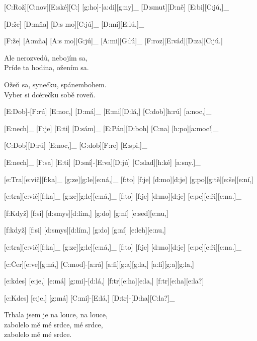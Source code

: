 
[C:Rož][C:nov][E:ské][C:] [g:ho]-[a:di][g:ny]_
[D:smut][D:ně] [E:bi][C:jú,]_

[D:že] [D:mňa] [D:s mo][C:jú]_ [D:mi][E:lú,]_

[F:že] [A:mňa] [A:s mo][G:jú]_ [A:mi][G:lú]_
[F:roz][E:vád][D:za][C:jú.]

Ale nerozvedů, nebojím sa,\\
Príde ta hodina, ožením sa.

Ožeň sa, synečku, spánembohem.\\
Vyber si dcérečku sobě roveň.



[E:Dob]-[F:rú] [E:noc,] [D:má]_ [E:mi][D:lá,] [C:dob][h:rú] [a:noc,]_

[E:nech]_ [F:je] [E:ti] [D:sám]_ [E:Pán][D:boh] [C:na] [h:po][a:moc!]_

[C:Dob][D:rú] [E:noc,]_ [G:dob][F:re] [E:spi,]_

[E:nech]_ [F:sa] [E:ti] [D:sní]-[E:va][D:jú] [C:slad][h:ké] [a:sny.]_



[e:Tra][e:vič][f:ka]_ [g:ze][g:le][e:ná,]_
[f:to] [f:je] [d:mo][d:je] [g:po][g:tě][e:še][e:ní,]

[e:tra][e:vič][f:ka]_ [g:ze][g:le][e:ná,]_
[f:to] [f:je] [d:mo][d:je] [c:pe][e:ři][c:na.]_

[f:Když] [f:si] [d:smys][d:lím,] [g:do] [g:ní] [e:sed][e:nu,]

[f:když] [f:si] [d:smys][d:lím,] [g:do] [g:ní] [e:leh][e:nu,]

[e:tra][e:vič][f:ka]_ [g:ze][g:le][e:ná,]_
[f:to] [f:je] [d:mo][d:je] [c:pe][e:ři][c:na.]_



[c:Čer][e:ve][g:ná,] [C:mod]-[a:rá] [a:fi][g:a][g:la,] [a:fi][g:a][g:la,]

[e:kdes] [e:je,] [e:má] [g:mi]-[d:lá,] [f:tr][e:ha][e:la,] [f:tr][e:ha][e:la?]

[c:Kdes] [e:je,] [g:má] [C:mi]-[E:lá,] [D:tr]-[D:ha][C:la?]_

Trhala jsem je na louce, na louce,\\
zabolelo mě mé srdce, mé srdce,\\
zabolelo mě mé srdce.



